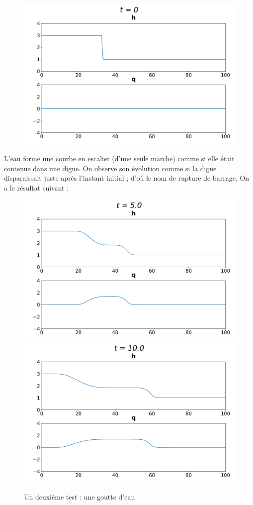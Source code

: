 \documentclass[
11pt, %
francais, %
singlespacing, %
headsepline, %
f%
]{MastersDoctoralThesis} %
\theoremstyle{definition}
\begin{document}
\begin{figure}
\centering
\includegraphics[scale = .7]{barrage0}
\end{figure}

L'eau forme une courbe en escalier (d'une seule marche) comme si elle était contenue dans une digue. On observe son évolution comme si la digue disparaissait juste après l'instant initial ; d'où le nom de
rupture de barrage. On a le résultat suivant :

\begin{figure}
\includegraphics[scale = .6]{barrage5}
\includegraphics[scale = .6]{barrage10} 
\caption{Un deuxième test : une goutte d'eau}
\end{figure}
\end{document}
